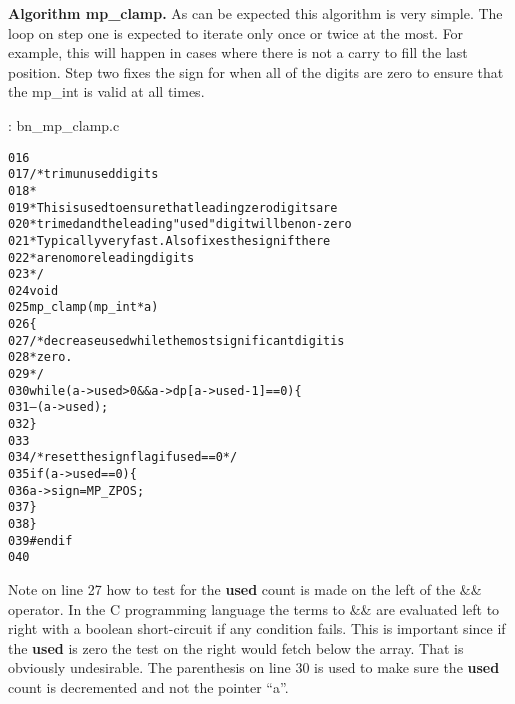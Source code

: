 \documentclass[b5paper]{book}
\begin{document}
\textbf{Algorithm mp\_clamp.}
As can be expected this algorithm is very simple.  The loop on step one is expected to iterate only once or twice at
the most.  For example, this will happen in cases where there is not a carry to fill the last position.  Step two fixes the sign for 
when all of the digits are zero to ensure that the mp\_int is valid at all times.

\vspace{+3mm}\begin{small}
\hspace{-5.1mm}{\bf File}: bn\_mp\_clamp.c
\vspace{-3mm}
\begin{alltt}
016   
017   /* trim unused digits 
018    *
019    * This is used to ensure that leading zero digits are
020    * trimed and the leading "used" digit will be non-zero
021    * Typically very fast.  Also fixes the sign if there
022    * are no more leading digits
023    */
024   void
025   mp_clamp (mp_int * a)
026   \{
027     /* decrease used while the most significant digit is
028      * zero.
029      */
030     while (a->used > 0 && a->dp[a->used - 1] == 0) \{
031       --(a->used);
032     \}
033   
034     /* reset the sign flag if used == 0 */
035     if (a->used == 0) \{
036       a->sign = MP_ZPOS;
037     \}
038   \}
039   #endif
040   
\end{alltt}
\end{small}

Note on line 27 how to test for the \textbf{used} count is made on the left of the \&\& operator.  In the C programming
language the terms to \&\& are evaluated left to right with a boolean short-circuit if any condition fails.  This is 
important since if the \textbf{used} is zero the test on the right would fetch below the array.  That is obviously 
undesirable.  The parenthesis on line 30 is used to make sure the \textbf{used} count is decremented and not
the pointer ``a''.  
\end{document}
